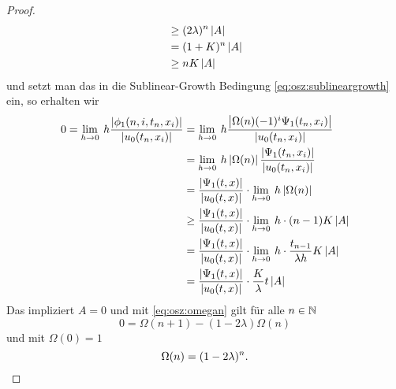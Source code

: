 \begin{proof}
\begin{align*}
&\geq (2 \lambda)^n \left| A \right|\\
&= (1 + K)^n \left| A \right|\\
&\geq n K  \left| A \right|\\
\end{align*}
und setzt man das in die Sublinear-Growth Bedingung \eqref{eq:osz:sublineargrowth} ein, so erhalten wir
\begin{align*}
0 = \lim_{h \to 0} \: h \frac{\left| \phi_1(n, i, t_n, x_i) \right|}{\left| u_0(t_n, x_i) \right|}
&= \lim_{h \to 0} \: h \frac{\left| \Omega(n) (-1)^i \Psi_1(t_n, x_i) \right|}{\left| u_0(t_n, x_i) \right|}\\
&= \lim_{h \to 0} \: h \left| \Omega(n) \right| \frac{\left| \Psi_1(t_n, x_i) \right|}{\left| u_0(t_n, x_i) \right|}\\
&= \frac{\left| \Psi_1(t, x) \right|}{\left| u_0(t, x) \right|} \cdot \lim_{h \to 0} \: h \left| \Omega(n) \right|\\
&\geq \frac{\left| \Psi_1(t, x) \right|}{\left| u_0(t, x) \right|} \cdot \lim_{h \to 0} \: h \cdot (n-1) K \left| A \right|\\
&= \frac{\left| \Psi_1(t, x) \right|}{\left| u_0(t, x) \right|} \cdot \lim_{h \to 0} \: h \cdot \frac{t_{n-1}}{\lambda h} K \left| A \right|\\
&= \frac{\left| \Psi_1(t, x) \right|}{\left| u_0(t, x) \right|} \cdot \frac{K}{\lambda} t \left| A \right|\\
\end{align*}
Das impliziert $A = 0$ und mit \eqref{eq:osz:omegan} gilt für alle $n \in \mathbb N$
\[ 0 = \Omega(n+1) - (1 - 2\lambda) \Omega(n) \]
und mit $\Omega(0) = 1$
\[ \Omega(n) = (1 - 2\lambda)^n. \qedhere \]
\end{proof}